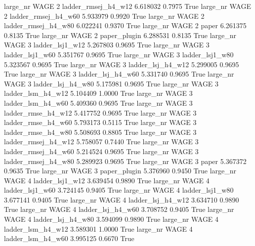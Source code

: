   large_nr     WAGE                 2 ladder_rmsej_h4_w12    6.618032      0.7975    True
  large_nr     WAGE                 2 ladder_rmsej_h4_w60    5.933979      0.9920    True
  large_nr     WAGE                 2 ladder_rmsej_h4_w80    6.022241      0.9370    True
  large_nr     WAGE                 2               paper    6.261375      0.8135    True
  large_nr     WAGE                 2        paper_plugin    6.288531      0.8135    True
  large_nr     WAGE                 3     ladder_lsj1_w12    5.267803      0.9695    True
  large_nr     WAGE                 3     ladder_lsj1_w60    5.351767      0.9695    True
  large_nr     WAGE                 3     ladder_lsj1_w80    5.323567      0.9695    True
  large_nr     WAGE                 3   ladder_lsj_h4_w12    5.299005      0.9695    True
  large_nr     WAGE                 3   ladder_lsj_h4_w60    5.331740      0.9695    True
  large_nr     WAGE                 3   ladder_lsj_h4_w80    5.175981      0.9695    True
  large_nr     WAGE                 3   ladder_lsm_h4_w12    5.104409      1.0000    True
  large_nr     WAGE                 3   ladder_lsm_h4_w60    5.409360      0.9695    True
  large_nr     WAGE                 3  ladder_rmse_h4_w12    5.417752      0.9695    True
  large_nr     WAGE                 3  ladder_rmse_h4_w60    5.793173      0.5115    True
  large_nr     WAGE                 3  ladder_rmse_h4_w80    5.508693      0.8805    True
  large_nr     WAGE                 3 ladder_rmsej_h4_w12    5.758057      0.7440    True
  large_nr     WAGE                 3 ladder_rmsej_h4_w60    5.214524      0.9695    True
  large_nr     WAGE                 3 ladder_rmsej_h4_w80    5.289923      0.9695    True
  large_nr     WAGE                 3               paper    5.367372      0.9635    True
  large_nr     WAGE                 3        paper_plugin    5.376960      0.9450    True
  large_nr     WAGE                 4     ladder_lsj1_w12    3.639454      0.9890    True
  large_nr     WAGE                 4     ladder_lsj1_w60    3.724145      0.9405    True
  large_nr     WAGE                 4     ladder_lsj1_w80    3.677141      0.9405    True
  large_nr     WAGE                 4   ladder_lsj_h4_w12    3.634710      0.9890    True
  large_nr     WAGE                 4   ladder_lsj_h4_w60    3.708752      0.9405    True
  large_nr     WAGE                 4   ladder_lsj_h4_w80    3.594099      0.9890    True
  large_nr     WAGE                 4   ladder_lsm_h4_w12    3.589301      1.0000    True
  large_nr     WAGE                 4   ladder_lsm_h4_w60    3.995125      0.6670    True
